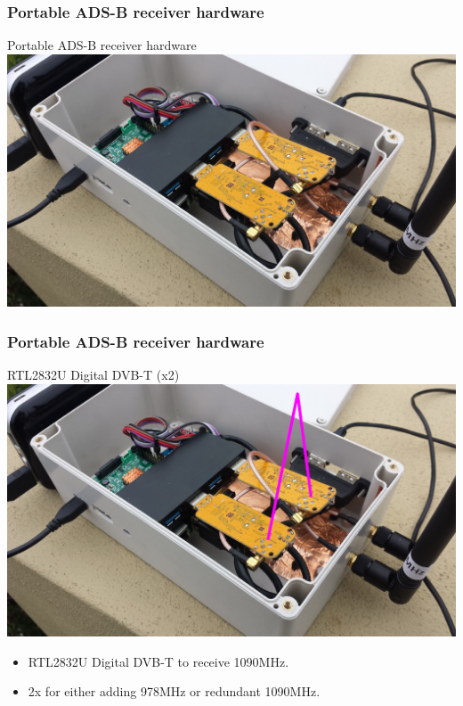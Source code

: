\begin{frame}
\frametitle{Portable ADS-B receiver hardware}
\begin{block}{Portable ADS-B receiver hardware}
\includegraphics[height=0.5\textheight]{image/adsb-hardware.png}
\end{block}
\end{frame}

\begin{frame}
\frametitle{Portable ADS-B receiver hardware}
\begin{block}{RTL2832U Digital DVB-T (x2)}
\includegraphics[height=0.5\textheight]{image/adsb-hardware-dvb.png}
\begin{itemize}
\item RTL2832U Digital DVB-T to receive 1090MHz.
\item 2x for either adding 978MHz or redundant 1090MHz.
\end{itemize}
\end{block}
\end{frame}

